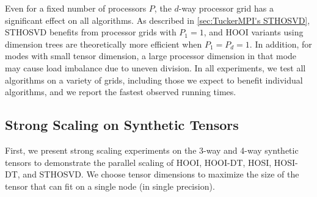 Even for a fixed number of processors $P$, the $d$-way processor grid has a
significant effect on all algorithms. As described in \cref{sec:TuckerMPI's STHOSVD},
STHOSVD benefits from processor grids with $P_1=1$, and HOOI variants using
dimension trees are theoretically more efficient when $P_1=P_d=1$. In addition,
for modes with small tensor dimension, a large processor dimension in that mode
may cause load imbalance due to uneven division. In all experiments, we test all
algorithms on a variety of grids, including those we expect to benefit
individual algorithms, and we report the fastest observed running times.

\subsection{Strong Scaling on Synthetic Tensors} \label{sec:synthetic_strong_scaling} 

    First, we present strong scaling
    experiments on the 3-way and 4-way synthetic tensors to demonstrate the parallel
    scaling of HOOI, HOOI-DT, HOSI, HOSI-DT, and STHOSVD. We choose tensor
    dimensions to maximize the size of the tensor that can fit on a single node (in
    single precision).

